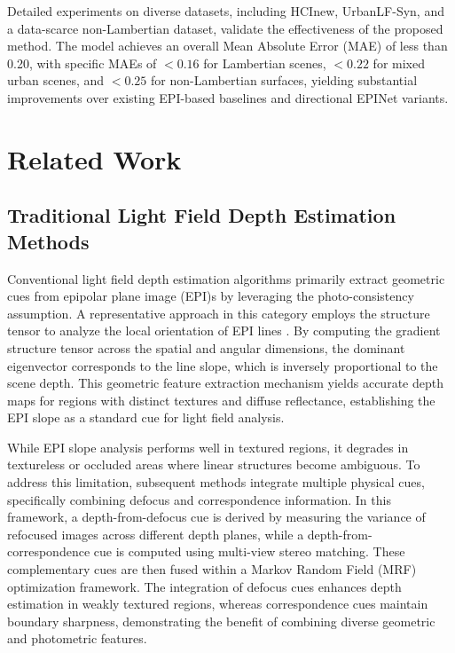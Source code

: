 \documentclass[lettersize,journal]{IEEEtran}
\begin{document}
Detailed experiments on diverse datasets, including HCInew, UrbanLF-Syn, and a data-scarce non-Lambertian dataset, validate the effectiveness of the proposed method. The model achieves an overall Mean Absolute Error (MAE) of less than 0.20, with specific MAEs of $<0.16$ for Lambertian scenes, $<0.22$ for mixed urban scenes, and $<0.25$ for non-Lambertian surfaces, yielding substantial improvements over existing EPI-based baselines and directional EPINet variants.

\section{Related Work}

\subsection{Traditional Light Field Depth Estimation Methods}

Conventional light field depth estimation algorithms primarily extract geometric cues from epipolar plane image (EPI)s by leveraging the photo-consistency assumption. A representative approach in this category employs the structure tensor to analyze the local orientation of EPI lines \cite{he2016}. By computing the gradient structure tensor across the spatial and angular dimensions, the dominant eigenvector corresponds to the line slope, which is inversely proportional to the scene depth. This geometric feature extraction mechanism yields accurate depth maps for regions with distinct textures and diffuse reflectance, establishing the EPI slope as a standard cue for light field analysis.

While EPI slope analysis performs well in textured regions, it degrades in textureless or occluded areas where linear structures become ambiguous. To address this limitation, subsequent methods integrate multiple physical cues, specifically combining defocus and correspondence information. In this framework, a depth-from-defocus cue is derived by measuring the variance of refocused images across different depth planes, while a depth-from-correspondence cue is computed using multi-view stereo matching. These complementary cues are then fused within a Markov Random Field (MRF) optimization framework. The integration of defocus cues enhances depth estimation in weakly textured regions, whereas correspondence cues maintain boundary sharpness, demonstrating the benefit of combining diverse geometric and photometric features.
\end{document}
